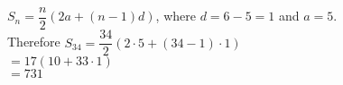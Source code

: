 $S_n=\dfrac{n}{2}(2a+(n-1)d)$, where $d=6-5=1$ and $a=5$.\\Therefore $S_{34}=\dfrac{34}{2}(2\cdot 5 +(34-1)\cdot 1)$\\$=17(10+33 \cdot1)$\\$=731$